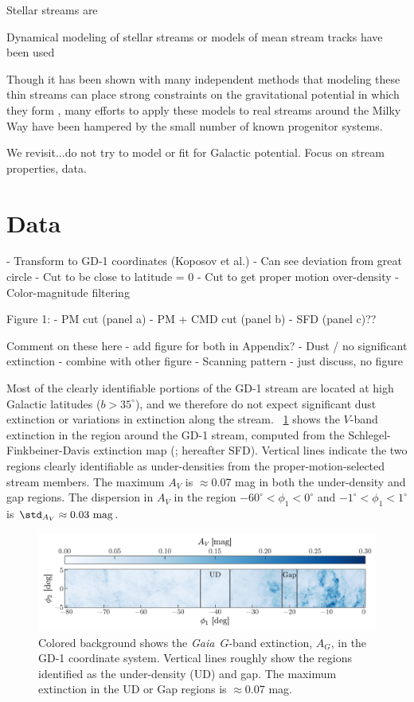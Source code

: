 \documentclass[modern]{aastex62}
\newcommand{\gaia}{\textsl{Gaia}}
\begin{document}
Stellar streams are

\citealt{Bonaca:2018}

Dynamical modeling of stellar streams or models of mean stream tracks have been used


Though it has been shown with many independent methods that modeling these thin streams can place strong constraints on the gravitational potential in which they form \citep{apw14,TODO}, many efforts to apply these models to real streams around the Milky Way have been hampered by the small number of known progenitor systems.


We revisit...do not try to model or fit for Galactic potential. Focus on stream properties, data.

\section{Data}
\label{sec:data}

- Transform to GD-1 coordinates (Koposov et al.)
    - Can see deviation from great circle
- Cut to be close to latitude = 0
- Cut to get proper motion over-density
- Color-magnitude filtering

Figure 1:
- PM cut (panel a)
- PM + CMD cut (panel b)
- SFD (panel c)??

Comment on these here - add figure for both in Appendix?
- Dust / no significant extinction - combine with other figure
- Scanning pattern - just discuss, no figure

Most of the clearly identifiable portions of the GD-1 stream are located at high
Galactic latitudes ($b > 35^\circ$), and we therefore do not expect significant
dust extinction or variations in extinction along the stream.
\figurename~\ref{fig:sfd} shows the $V$-band extinction in the region around the
GD-1 stream, computed from the Schlegel-Finkbeiner-Davis extinction map
(\cite{Schlegel:1998}; hereafter SFD).
Vertical lines indicate the two regions clearly identifiable as under-densities
from the proper-motion-selected stream members.
The maximum $A_V$ is $\approx$0.07 mag in both the under-density and gap
regions.
The dispersion in $A_V$ in the region $-60^\circ < \phi_1 < 0^\circ$ and
$-1^\circ < \phi_1 < 1^\circ$ is $\std_{A_V} \approx 0.03~\textrm{mag}$.

\begin{figure}[h]
\begin{center}
\includegraphics[width=\textwidth]{sfd.pdf}
\end{center}
\caption{%
Colored background shows the \gaia\ $G$-band extinction, $A_G$, in the GD-1
coordinate system.
Vertical lines roughly show the regions identified as the under-density (UD) and
gap.
The maximum extinction in the UD or Gap regions is $\approx$0.07 mag.
\label{fig:sfd}
}
\end{figure}
\end{document}

